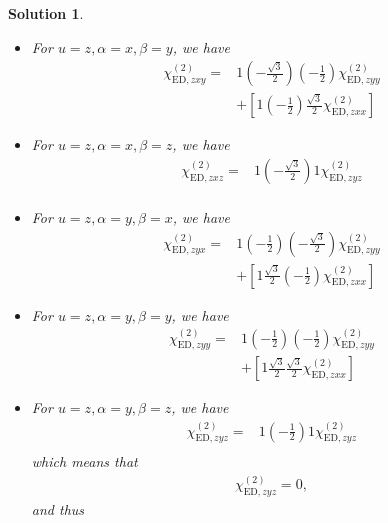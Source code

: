\documentclass[UTF8,10pt,a4paper]{article}
\theoremstyle{Problem}
\theoremstyle{Solution}
\newtheorem*{sol}{Solution}
\begin{document}
\begin{sol}
\begin{itemize}
\small\begin{align}
\nonumber\chi_{\text{ED},zxx}^{(2)}=&1\left(-\frac{\sqrt{3}}{2}\right)\left(-\frac{\sqrt{3}}{2}\right)\chi_{\text{ED},zyy}^{(2)}\\
&+\left[1\left(-\frac{1}{2}\right)\left(-\frac{1}{2}\right)\chi_{\text{ED},zxx}^{(2)}\right]
\end{align}\normalsize
\item For $u=z,\alpha=x,\beta=y$, we have
\small\begin{align}
\nonumber\chi_{\text{ED},zxy}^{(2)}=&1\left(-\frac{\sqrt{3}}{2}\right)\left(-\frac{1}{2}\right)\chi_{\text{ED},zyy}^{(2)}\\
&+\left[1\left(-\frac{1}{2}\right)\frac{\sqrt{3}}{2}\chi_{\text{ED},zxx}^{(2)}\right]
\end{align}\normalsize
\item For $u=z,\alpha=x,\beta=z$, we have
\small\begin{align}
\nonumber\chi_{\text{ED},zxz}^{(2)}=&1\left(-\frac{\sqrt{3}}{2}\right)1\chi_{\text{ED},zyz}^{(2)}\\
&
\end{align}\normalsize
\item For $u=z,\alpha=y,\beta=x$, we have
\small\begin{align}
\nonumber\chi_{\text{ED},zyx}^{(2)}=&1\left(-\frac{1}{2}\right)\left(-\frac{\sqrt{3}}{2}\right)\chi_{\text{ED},zyy}^{(2)}\\
&+\left[1\frac{\sqrt{3}}{2}\left(-\frac{1}{2}\right)\chi_{\text{ED},zxx}^{(2)}\right]
\end{align}\normalsize
\item For $u=z,\alpha=y,\beta=y$, we have
\small\begin{align}
\nonumber\chi_{\text{ED},zyy}^{(2)}=&1\left(-\frac{1}{2}\right)\left(-\frac{1}{2}\right)\chi_{\text{ED},zyy}^{(2)}\\
&+\left[1\frac{\sqrt{3}}{2}\frac{\sqrt{3}}{2}\chi_{\text{ED},zxx}^{(2)}\right]
\end{align}\normalsize
\item For $u=z,\alpha=y,\beta=z$, we have
\small\begin{align}
\nonumber\chi_{\text{ED},zyz}^{(2)}=&1\left(-\frac{1}{2}\right)1\chi_{\text{ED},zyz}^{(2)}\\
&
\end{align}\normalsize
which means that
\begin{align}
    \chi_{\text{ED},zyz}^{(2)}=0,
\end{align}
and thus
\begin{align}

\end{align}
\end{itemize}
\end{sol}
\end{document}
